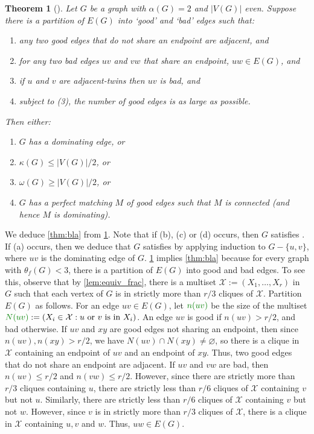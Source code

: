 \documentclass[11pt]{article}
\numberwithin{equation}{section}
\theoremstyle{plain}
\newtheorem{thm}[equation]{Theorem}
\theoremstyle{definition}
\renewcommand{\geq}{\geqslant}
\renewcommand{\leq}{\leqslant}
\newcommand{\mathdefn}[1]{\textcolor{green!50!black}{#1}}
\begin{document}
\begin{thm}[\citet{Blasiak07}]
    \label{thm:good_bad}
    Let $G$ be a graph with $\alpha(G) = 2$ and $|V(G)|$ even. Suppose there is a partition of $E(G)$ into `good' and `bad' edges such that:
    \begin{enumerate}[label=(\arabic*)]
        \item any two good edges that do not share an endpoint are adjacent, and
        \item for any two bad edges $uv$ and $vw$ that share an endpoint, $uw \in E(G)$, and
        \item if $u$ and $v$ are adjacent-twins then $uv$ is bad, and
        \item subject to (3), the number of good edges is as large as possible.
    \end{enumerate}
    Then either:
    \begin{enumerate}[label=(\alph*)]
        \item $G$ has a dominating edge, or
        \item $\kappa(G) \leq |V(G)|/2$, or
        \item $\omega(G) \geq |V(G)|/2$, or
        \item $G$ has a perfect matching $M$ of good edges such that $M$ is connected (and hence $M$ is dominating).
    \end{enumerate}
\end{thm}
We deduce \cref{thm:bla} from \cref{thm:good_bad}.
Note that if (b), (c) or (d) occurs, then $G$ satisfies . If (a) occurs, then we deduce that $G$ satisfies  by applying induction to $G - \{u, v\}$, where $uv$ is the dominating edge of $G$.
\cref{thm:good_bad} implies \cref{thm:bla} because for every graph with $\theta_f(G) < 3$, there is a partition of $E(G)$ into good and bad edges. To see this, observe that by \cref{lem:equiv_frac}, there is a multiset $\mathcal{X}:=(X_1, \dots, X_r)$ in $G$ such that each vertex of $G$ is in strictly more than $r/3$ cliques of $\mathcal{X}$. Partition $E(G)$ as follows. For an edge $uv \in E(G)$, let $\mathdefn{n(uv)}$ be the size of the multiset $\mathdefn{N(uv)}:= (X_i \in \mathcal{X}: \text{$u$ or $v$ is in $X_i$})$. An edge $uv$ is good if $n(uv) > r/2$, and bad otherwise. If $uv$ and $xy$ are good edges not sharing an endpoint, then since $n(uv), n(xy) > r/2$, we have $N(uv) \cap N(xy) \neq \varnothing$, so there is a clique in $\mathcal{X}$ containing an endpoint of $uv$ and an endpoint of $xy$. Thus, two good edges that do not share an endpoint are adjacent. If $uv$ and $vw$ are bad, then $n(uv) \leq r/2$ and $n(vw) \leq r/2$. However, since there are strictly more than $r/3$ cliques containing $u$, there are strictly less than $r/6$ cliques of $\mathcal{X}$ containing $v$ but not $u$. Similarly, there are strictly less than $r/6$ cliques of $\mathcal{X}$ containing $v$ but not $w$. However, since $v$ is in strictly more than $r/3$ cliques of $\mathcal{X}$, there is a clique in $\mathcal{X}$ containing $u,v$ and $w$. Thus, $uw \in E(G)$.
\end{document}
